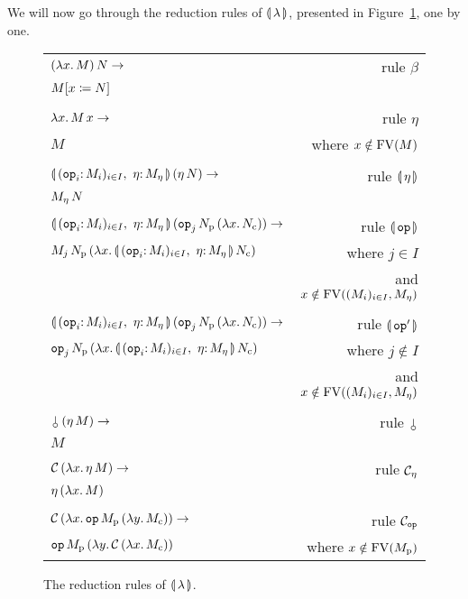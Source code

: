 We will now go through the reduction rules of ${\llparenthesis \, \lambda \, \rrparenthesis}$, presented in
Figure~\ref{fig:reductions}, one by one.


\begin{figure}
  \centering
  \begin{tabular}{lr}
  $(\lambda x.\, M)\,N \to$ & rule $\beta$ \\
  $M[x \coloneqq N]$ & \\
  \\
  $\lambda x.\, M\,x \to$ & rule $\eta$ \\
  $M$ & where $x \notin \operatorname{FV}(M)$ \\
  \\
  $\ap{\cibanana}{(\ap{\eta}{N})} \to$ & rule $\llparenthesis \, \eta \, \rrparenthesis$ \\
  $M_\eta\,N$ & \\
  \\
  $\ap{\cibanana}{(\ap{\ap{\op{op}_j}{N_{\mathrm{p}}}}{(\lam{x}{N_{\mathrm{c}}})})} \to$ & rule $\llparenthesis \, \mathtt{op} \, \rrparenthesis$ \\
  $\ap{M_j}{\ap{N_{\mathrm{p}}}{(\lam{x}{\ap{\cibanana}{N_{\mathrm{c}}}})}}$
  & where $j \in I$ \\
  & and $x \notin \operatorname{FV}((M_i)_{i \in I}, M_\eta)$ \\
  \\
  $\ap{\cibanana}{(\ap{\ap{\op{op}_j}{N_{\mathrm{p}}}}{(\lam{x}{N_{\mathrm{c}}})})} \to$ & rule $\llparenthesis \, \mathtt{op}' \, \rrparenthesis$ \\
  $\ap{\op{op}_j}{\ap{N_{\mathrm{p}}}{(\lam{x}{\ap{\cibanana}{N_{\mathrm{c}}}})}}$
  & where $j \notin I$ \\
  & and $x \notin \operatorname{FV}((M_i)_{i \in I}, M_\eta)$ \\
  \\
  $\ap{\cherry}{(\ap{\eta}{M})} \to$ & rule $\cherry$ \\
  $M$ & \\
  \\
  $\mathcal{C}\,(\lambda x.\, \eta\,M) \to$ & rule $\mathcal{C}_\eta$ \\
  $\eta\,(\lambda x.\, M)$ & \\
  \\
  $\mathcal{C}\,(\lambda x.\, \mathtt{op}\,M_{\mathrm{p}}\,(\lambda y.\, M_{\mathrm{c}})) \to$ & rule $\mathcal{C}_{\mathtt{op}}$ \\
  $\mathtt{op}\,M_{\mathrm{p}}\,(\lambda y.\, \mathcal{C}\,(\lambda x.\, M_{\mathrm{c}}))$
  & where $x \notin \operatorname{FV}(M_{\mathrm{p}})$
  \end{tabular}
  
  \caption{\label{fig:reductions} The reduction rules of ${\llparenthesis \, \lambda \, \rrparenthesis}$.}
\end{figure}


